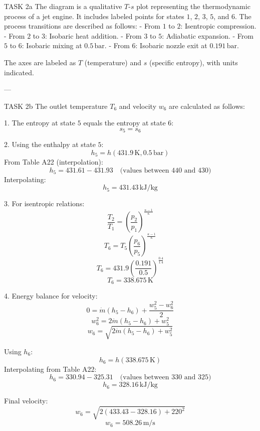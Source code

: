 TASK 2a  
The diagram is a qualitative \( T \)-\( s \) plot representing the thermodynamic process of a jet engine. It includes labeled points for states \( 1 \), \( 2 \), \( 3 \), \( 5 \), and \( 6 \). The process transitions are described as follows:  
- From \( 1 \) to \( 2 \): Isentropic compression.  
- From \( 2 \) to \( 3 \): Isobaric heat addition.  
- From \( 3 \) to \( 5 \): Adiabatic expansion.  
- From \( 5 \) to \( 6 \): Isobaric mixing at \( 0.5 \, \text{bar} \).  
- From \( 6 \): Isobaric nozzle exit at \( 0.191 \, \text{bar} \).  

The axes are labeled as \( T \) (temperature) and \( s \) (specific entropy), with units indicated.  

---

TASK 2b  
The outlet temperature \( T_6 \) and velocity \( w_6 \) are calculated as follows:  

1. The entropy at state \( 5 \) equals the entropy at state \( 6 \):  
\[
s_5 = s_6
\]

2. Using the enthalpy at state \( 5 \):  
\[
h_5 = h(431.9 \, \text{K}, 0.5 \, \text{bar})  
\]
From Table A22 (interpolation):  
\[
h_5 = 431.61 - 431.93 \quad \text{(values between 440 and 430)}  
\]
Interpolating:  
\[
h_5 = 431.43 \, \text{kJ/kg}
\]

3. For isentropic relations:  
\[
\frac{T_2}{T_1} = \left( \frac{p_2}{p_1} \right)^{\frac{\kappa - 1}{\kappa}}  
\]
\[
T_6 = T_5 \left( \frac{p_6}{p_5} \right)^{\frac{\kappa - 1}{\kappa}}  
\]
\[
T_6 = 431.9 \left( \frac{0.191}{0.5} \right)^{\frac{0.4}{1.4}}  
\]
\[
T_6 = 338.675 \, \text{K}
\]

4. Energy balance for velocity:  
\[
0 = \dot{m}(h_5 - h_6) + \frac{w_5^2 - w_6^2}{2}  
\]
\[
w_6^2 = 2 \dot{m}(h_5 - h_6) + w_5^2  
\]
\[
w_6 = \sqrt{2 \dot{m}(h_5 - h_6) + w_5^2}  
\]

Using \( h_6 \):  
\[
h_6 = h(338.675 \, \text{K})  
\]
Interpolating from Table A22:  
\[
h_6 = 330.94 - 325.31 \quad \text{(values between 330 and 325)}  
\]
\[
h_6 = 328.16 \, \text{kJ/kg}
\]

Final velocity:  
\[
w_6 = \sqrt{2 (433.43 - 328.16) + 220^2}  
\]
\[
w_6 = 508.26 \, \text{m/s}
\]  

